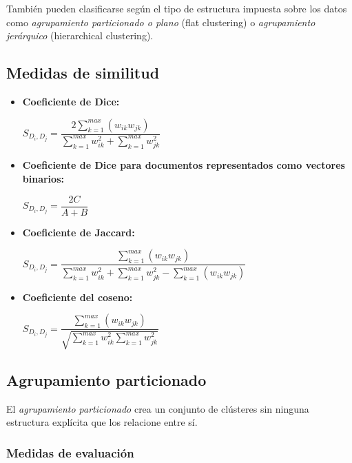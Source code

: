 \documentclass{llncs}
\begin{document}
Tambi\'en pueden clasificarse seg\'un el tipo de estructura impuesta sobre los datos como \textit{agrupamiento particionado o plano} (flat clustering) o \textit{agrupamiento jer\'arquico} (hierarchical clustering).

\subsection{Medidas de similitud}
\begin{itemize}
	\item \textbf{Coeficiente de Dice:}
	\begin{center}
		$ S_{D_{i}, D_{j}} = \dfrac{2 \sum_{k=1}^{max} (w_{ik}w_{jk})}{\sum_{k=1}^{max}w_{ik}^{2} + \sum_{k=1}^{max}w_{jk}^{2}} $
	\end{center}
	\item \textbf{Coeficiente de Dice para documentos representados como vectores binarios:}
	\begin{center}
		$ S_{D_{i}, D_{j}} = \dfrac{2C}{A+B} $
	\end{center}
	\item \textbf{Coeficiente de Jaccard:}
	\begin{center}
		$ S_{D_{i}, D_{j}} = \dfrac{\sum_{k=1}^{max} (w_{ik}w_{jk})}{\sum_{k=1}^{max}w_{ik}^{2} + \sum_{k=1}^{max}w_{jk}^{2} - \sum_{k=1}^{max} (w_{ik}w_{jk})} $
	\end{center}
	\item \textbf{Coeficiente del coseno:}
	\begin{center}
		$ S_{D_{i}, D_{j}} = \dfrac{\sum_{k=1}^{max} (w_{ik}w_{jk})}{\sqrt{\sum_{k=1}^{max}w_{ik}^{2} \sum_{k=1}^{max}w_{jk}^{2}}} $
	\end{center}
\end{itemize}

\subsection{Agrupamiento particionado}

El \textit{agrupamiento particionado} crea un conjunto  de clústeres sin ninguna estructura explícita que los relacione entre sí. 

\subsubsection{Medidas de evaluaci\'on}
\end{document}
